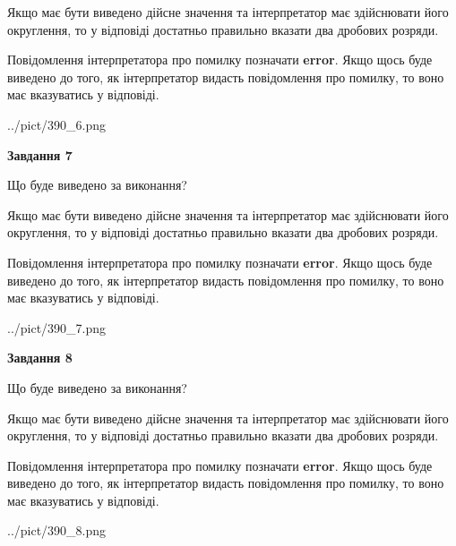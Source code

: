 \documentclass[12pt, ukrainian]{article}
\begin{document}
{\begin {Large}
Якщо має бути виведено дійсне значення та інтерпретатор має здійснювати його округлення, 
то у відповіді достатньо правильно вказати два дробових розряди.

Повідомлення інтерпретатора про помилку позначати \textbf{error}.
Якщо щось буде виведено до того, як інтерпретатор видасть повідомлення про помилку, 
то воно має вказуватись у відповіді. \par

\begin{center}
	{../pict/390_6.png}
\end{center}
\newpage

{\begin {center}\textbf{Завдання 7}\end {center}}\par
Що буде виведено за виконання? \par

Якщо має бути виведено дійсне значення та інтерпретатор має здійснювати його округлення, 
то у відповіді достатньо правильно вказати два дробових розряди.

Повідомлення інтерпретатора про помилку позначати \textbf{error}.
Якщо щось буде виведено до того, як інтерпретатор видасть повідомлення про помилку, 
то воно має вказуватись у відповіді. \par

\begin{center}
	{../pict/390_7.png}
\end{center}
\newpage

{\begin {center}\textbf{Завдання 8}\end {center}}\par
Що буде виведено за виконання? \par

Якщо має бути виведено дійсне значення та інтерпретатор має здійснювати його округлення, 
то у відповіді достатньо правильно вказати два дробових розряди.

Повідомлення інтерпретатора про помилку позначати \textbf{error}.
Якщо щось буде виведено до того, як інтерпретатор видасть повідомлення про помилку, 
то воно має вказуватись у відповіді. \par

\begin{center}
	{../pict/390_8.png}
\end{center}
\newpage


\end{Large}}
\end{document}
